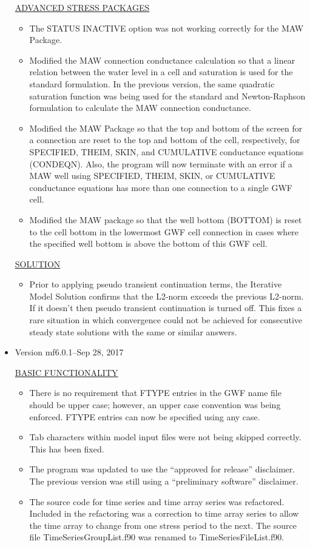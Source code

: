 \documentclass[11pt,twoside,twocolumn]{usgsreport}
\begin{document}
\begin{itemize}
\underline{ADVANCED STRESS PACKAGES}
\begin{itemize}
\item The STATUS INACTIVE option was not working correctly for the MAW Package.
\item Modified the MAW connection conductance calculation so that a linear relation between the water level in a cell and saturation is used for the standard formulation. In the previous version, the same quadratic saturation function was being used for the standard and Newton-Raphson formulation to calculate the MAW connection conductance. 
\item Modified the MAW Package so that the top and bottom of the screen for a connection are reset to the top and bottom of the cell, respectively, for SPECIFIED, THEIM, SKIN, and CUMULATIVE conductance equations (CONDEQN). Also, the program will now terminate with an error if a MAW well using SPECIFIED, THEIM, SKIN, or CUMULATIVE conductance equations has more than one connection to a single GWF cell. 
\item Modified the MAW package so that the well bottom (BOTTOM) is reset to the cell bottom in the lowermost GWF cell connection in cases where the specified well bottom is above the bottom of this GWF cell.
\end{itemize}

\underline{SOLUTION}
\begin{itemize}
\item Prior to applying pseudo transient continuation terms, the Iterative Model Solution confirms that the L2-norm exceeds the previous L2-norm.  If it doesn't then pseudo transient continuation is turned off.  This fixes a rare situation in which convergence could not be achieved for consecutive steady state solutions with the same or similar answers. 
\end{itemize}


\item Version mf6.0.1--Sep 28, 2017

\underline{BASIC FUNCTIONALITY}
\begin{itemize}
\item There is no requirement that FTYPE entries in the GWF name file should be upper case; however, an upper case convention was being enforced.  FTYPE entries can now be specified using any case.
\item Tab characters within model input files were not being skipped correctly.  This has been fixed.
\item The program was updated to use the ``approved for release'' disclaimer.  The previous version was still using a ``preliminary software'' disclaimer.
\item The source code for time series and time array series was refactored.  Included in the refactoring was a correction to time array series to allow the time array to change from one stress period to the next.  The source file TimeSeriesGroupList.f90 was renamed to TimeSeriesFileList.f90.
\end{itemize}


\end{itemize}
\end{document}
